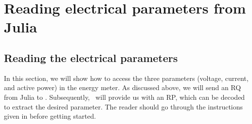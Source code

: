 


\section{Reading electrical parameters from Julia}
\subsection{Reading the electrical parameters}
In this section, we will show how to access the three parameters (voltage, current, and active power) in the energy meter. As discussed above, we will send an RQ from Julia to \arduino. Subsequently, \arduino\ will provide us with an RP, which can be decoded to extract the desired parameter. The reader should go through the instructions given in  before getting started.

